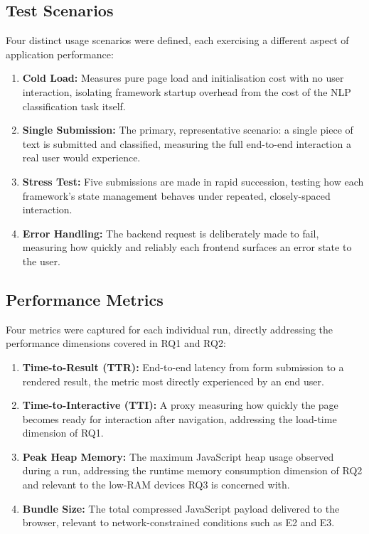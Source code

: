 \documentclass[11pt,a4paper]{report}
\begin{document}
\subsection{Test Scenarios}

Four distinct usage scenarios were defined, each exercising a different aspect of application performance:

\begin{enumerate}
  \item \textbf{Cold Load:} Measures pure page load and initialisation
  cost with no user interaction, isolating framework startup overhead
  from the cost of the NLP classification task itself.
  \item \textbf{Single Submission:} The primary, representative scenario:
  a single piece of text is submitted and classified, measuring the full
  end-to-end interaction a real user would experience.
  \item \textbf{Stress Test:} Five submissions are made in rapid
  succession, testing how each framework's state management behaves
  under repeated, closely-spaced interaction.
  \item \textbf{Error Handling:} The backend request is deliberately
  made to fail, measuring how quickly and reliably each frontend
  surfaces an error state to the user.
\end{enumerate}

\subsection{Performance Metrics}

Four metrics were captured for each individual run, directly addressing the performance dimensions covered in RQ1 and RQ2:

\begin{enumerate}
  \item \textbf{Time-to-Result (TTR):} End-to-end latency from form
  submission to a rendered result, the metric most directly experienced
  by an end user.
  \item \textbf{Time-to-Interactive (TTI):} A proxy measuring how quickly
  the page becomes ready for interaction after navigation, addressing the
  load-time dimension of RQ1.
  \item \textbf{Peak Heap Memory:} The maximum JavaScript heap usage
  observed during a run, addressing the runtime memory consumption
  dimension of RQ2 and relevant to the low-RAM devices RQ3 is concerned
  with.
  \item \textbf{Bundle Size:} The total compressed JavaScript payload
  delivered to the browser, relevant to network-constrained conditions
  such as E2 and E3.
\end{enumerate}
\end{document}

